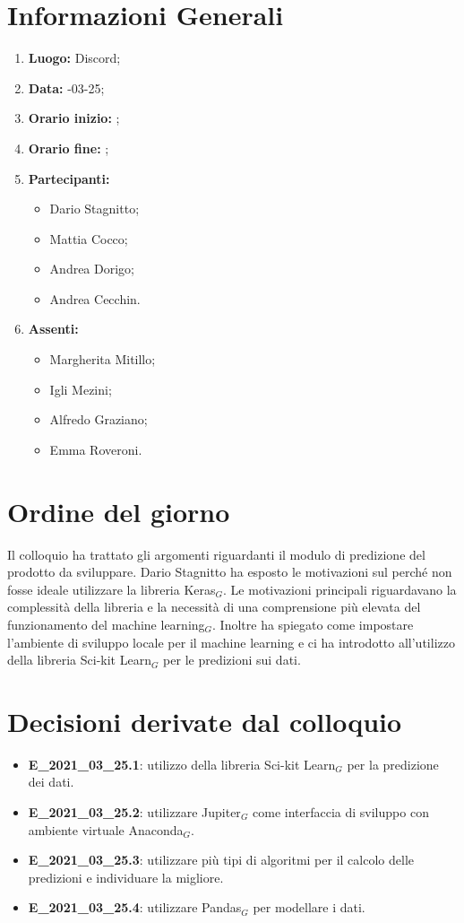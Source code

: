 \newpage
\section{Informazioni Generali}
\begin{enumerate}
	\item \textbf{Luogo:} \normalfont Discord;
	\item \textbf{Data:} -03-25;
	\item \textbf{Orario inizio:} ;
	\item \textbf{Orario fine:} ;
	\item \textbf{Partecipanti:}
	\begin{itemize}
		\item Dario Stagnitto;
		\item Mattia Cocco;
		\item Andrea Dorigo;
		\item Andrea Cecchin.
	\end{itemize}
	\item \textbf{Assenti:}
	\begin{itemize}
		\item Margherita Mitillo;
		\item Igli Mezini;
		\item Alfredo Graziano;
		\item Emma Roveroni.
	\end{itemize}
\end{enumerate}
\section{Ordine del giorno}
Il colloquio ha trattato gli argomenti riguardanti il modulo di predizione del prodotto da sviluppare. Dario Stagnitto ha esposto le motivazioni sul perché non fosse ideale utilizzare la libreria Keras$_G$.
Le motivazioni principali riguardavano la complessità della libreria e la necessità di una comprensione più elevata del funzionamento del machine learning$_G$.
Inoltre ha spiegato come impostare l'ambiente di sviluppo locale per il machine learning e ci ha introdotto all'utilizzo della libreria Sci-kit Learn$_G$ per le predizioni sui dati.
\section{Decisioni derivate dal colloquio}
\begin{itemize}
	\item \textbf{E\_2021\_03\_25.1}: utilizzo della libreria Sci-kit Learn$_G$ per la predizione dei dati.
	\item \textbf{E\_2021\_03\_25.2}: utilizzare Jupiter$_G$ come interfaccia di sviluppo con ambiente virtuale Anaconda$_G$.
	\item \textbf{E\_2021\_03\_25.3}: utilizzare più tipi di algoritmi per il calcolo delle predizioni e individuare la migliore.
	\item \textbf{E\_2021\_03\_25.4}: utilizzare Pandas$_G$ per modellare i dati.
\end{itemize}